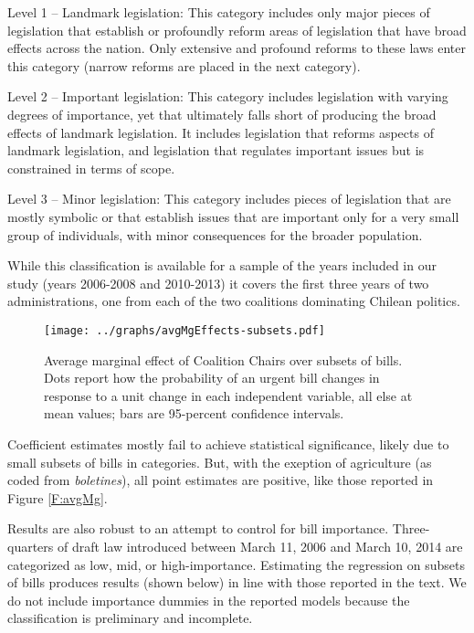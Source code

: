 \documentclass[letter,12pt]{article}
\begin{document}
Level 1 – Landmark legislation: This category includes only major pieces of legislation that establish or profoundly reform areas of legislation that have broad effects across the nation. Only extensive and profound reforms to these laws enter this category (narrow reforms are placed in the next category). 

Level 2 – Important legislation: This category includes legislation with varying degrees of importance, yet that ultimately falls short of producing the broad effects of landmark legislation. It includes legislation that reforms aspects of landmark legislation, and legislation that regulates important issues but is constrained in terms of scope. 

Level 3 – Minor legislation: This category includes pieces of legislation that are mostly symbolic or that establish issues that are important only for a very small group of individuals, with minor consequences for the broader population. 

While this classification is available for a sample of the years included in our study (years 2006-2008 and 2010-2013) it covers the first three years of two administrations, one from each of the two coalitions dominating Chilean politics.



\begin{figure}
  \centering
    \caption{Average marginal effect of Coalition Chairs over subsets of bills. Dots report how the probability of an urgent bill changes in response to a unit change in each independent variable, all else at mean values; bars are 95-percent confidence intervals.}\label{F:avgMgSub}
    \texttt{[image: ../graphs/avgMgEffects-subsets.pdf]}
\end{figure}

Coefficient estimates mostly fail to achieve statistical significance, likely due to small subsets of bills in categories. But, with the exeption of agriculture (as coded from \emph{boletines}), all point estimates are positive, like those reported in Figure \ref{F:avgMg}. 

Results are also robust to an attempt to control for bill importance. Three-quarters of draft law introduced between March 11, 2006 and March 10, 2014 are categorized as low, mid, or high-importance. Estimating the regression on subsets of bills produces results (shown below) in line with those reported in the text. We do not include importance dummies in the reported models because the classification is preliminary and incomplete. 
\end{document}
